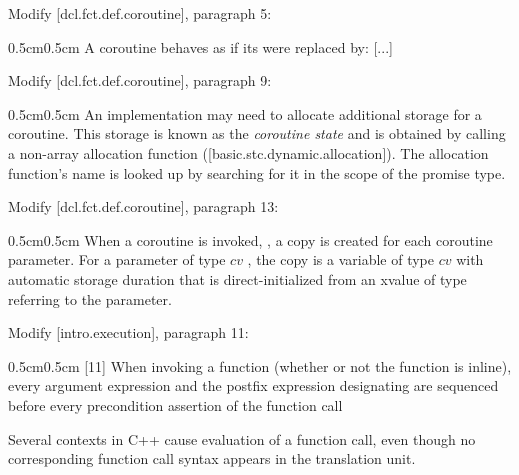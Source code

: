 Modify [dcl.fct.def.coroutine], paragraph 5:
\begin{adjustwidth}{0.5cm}{0.5cm}
A coroutine behaves as if its  were replaced by: [...]
\end{adjustwidth}

Modify [dcl.fct.def.coroutine], paragraph 9:
\begin{adjustwidth}{0.5cm}{0.5cm}
An implementation may need to allocate additional storage for a coroutine. This storage is known as the \emph{coroutine state} and is obtained by calling a non-array allocation function ([basic.stc.dynamic.allocation]). The allocation function's name is looked up by searching for it in the scope of the promise type.
\end{adjustwidth}

Modify [dcl.fct.def.coroutine], paragraph 13:
\begin{adjustwidth}{0.5cm}{0.5cm}
When a coroutine is invoked, , a copy is created for each coroutine parameter. For a parameter  of type $cv$ , the copy is a variable of type $cv$  with automatic storage duration that is direct-initialized from an xvalue of type  referring to the parameter.

\end{adjustwidth}

Modify [intro.execution], paragraph 11:

\begin{adjustwidth}{0.5cm}{0.5cm}
[11]  When invoking a function  (whether or not the function is inline),
every argument expression and the postfix expression designating  are
sequenced before every precondition assertion of the function call 

Several contexts in C++ cause evaluation of a function call, even though no
corresponding function call syntax appears in the translation unit.
\end{adjustwidth}

